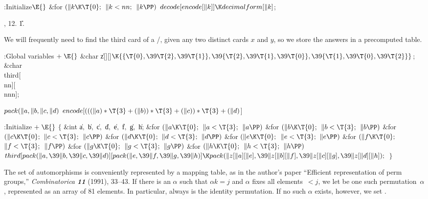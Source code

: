 \B{}:Initialize\X${}\E{}$\6
\&{for} ${}(\|k\K\T{0};{}$ ${}\|k<\\{nn};{}$ ${}\|k\PP){}$\1\5
${}\\{decode}[\\{encode}[\|k]]\K\\{decimalform}[\|k]{}$;\2\par
{}, 12.
\U1.\fi

We will frequently need to find the third card of a \SET/,
given any two distinct cards $x$ and $y$, so we store the answers
in a precomputed table.

\Y\B\4:Global variables\X${}\mathrel+\E{}$\6
\&{char} \|z[][]${}\K\{\{\T{0},\39\T{2},\39\T{1}\},\39\{\T{2},\39%
\T{1},\39\T{0}\},\39\{\T{1},\39\T{0},\39\T{2}\}\}{}$;\6
\&{char} \\{third}[\\{nn}][\\{nnn}];\par
\fi

\B\D$\\{pack}(\|a,\|b,\|c,\|d)$ \5
$\\{encode}[(((\|a)*\T{3}+(\|b))*\T{3}+(\|c))*\T{3}+(\|d){}$]\par
\Y\B\4:Initialize\X${}\mathrel+\E{}$\6
${}\{{}$\1\6
\&{int} \|a${},{}$ \|b${},{}$ \|c${},{}$ \|d${},{}$ \|e${},{}$ \|f${},{}$ %
\|g${},{}$ \|h;\7
\&{for} ${}(\|a\K\T{0};{}$ ${}\|a<\T{3};{}$ ${}\|a\PP){}$\1\6
\&{for} ${}(\|b\K\T{0};{}$ ${}\|b<\T{3};{}$ ${}\|b\PP){}$\1\6
\&{for} ${}(\|c\K\T{0};{}$ ${}\|c<\T{3};{}$ ${}\|c\PP){}$\1\6
\&{for} ${}(\|d\K\T{0};{}$ ${}\|d<\T{3};{}$ ${}\|d\PP){}$\1\6
\&{for} ${}(\|e\K\T{0};{}$ ${}\|e<\T{3};{}$ ${}\|e\PP){}$\1\6
\&{for} ${}(\|f\K\T{0};{}$ ${}\|f<\T{3};{}$ ${}\|f\PP){}$\1\6
\&{for} ${}(\|g\K\T{0};{}$ ${}\|g<\T{3};{}$ ${}\|g\PP){}$\1\6
\&{for} ${}(\|h\K\T{0};{}$ ${}\|h<\T{3};{}$ ${}\|h\PP){}$\1\5
${}\\{third}[\\{pack}(\|a,\39\|b,\39\|c,\39\|d)][\\{pack}(\|e,\39\|f,\39\|g,\39%
\|h)]\K\\{pack}(\|z[\|a][\|e],\39\|z[\|b][\|f],\39\|z[\|c][\|g],\39\|z[\|d][%
\|h]);{}$\2\2\2\2\2\2\2\2\6
\4${}\}{}$\2\par
\fi

The set of automorphisms is conveniently represented by a mapping
table, as in the author's paper ``Efficient representation of
perm groups,'' {\sl Combinatorica\/ \bf11} (1991), 33--43.
If there is an $\alpha$ such that $\alpha k=j$ and $\alpha$ fixes
all elements~$<j$, we let  be one such permutation~$%
\alpha$,
represented as an array of 81 elements. In particular, 
always is
the identity permutation. If no such $\alpha$ exists, however, we set
.

